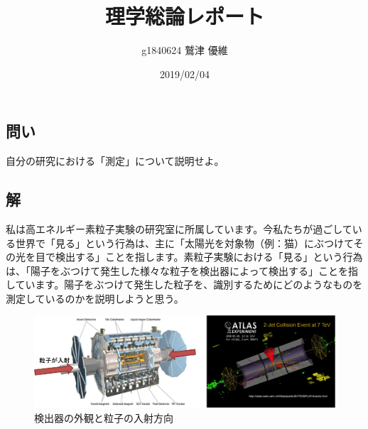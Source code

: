 \documentclass[10pt]{ujarticle}
\title{理学総論レポート}
\author{g1840624 鷲津 優維}
\date{2019/02/04}
\begin{document}
\maketitle
\section{}
\subsection{問い}
自分の研究における「測定」について説明せよ。

\subsection{解}
私は高エネルギー素粒子実験の研究室に所属しています。今私たちが過ごしている世界で「見る」という行為は、主に「太陽光を対象物（例：猫）にぶつけてその光を目で検出する」ことを指します。素粒子実験における「見る」という行為は、「陽子をぶつけて発生した様々な粒子を検出器によって検出する」ことを指しています。陽子をぶつけて発生した粒子を、識別するためにどのようなものを測定しているのかを説明しようと思う。
\begin{figure}[h]
\begin{center}
\includegraphics[width=15cm]{./atlas.png}
\caption{検出器の外観と粒子の入射方向}
\end{center}
\end{figure}

\end{document}
